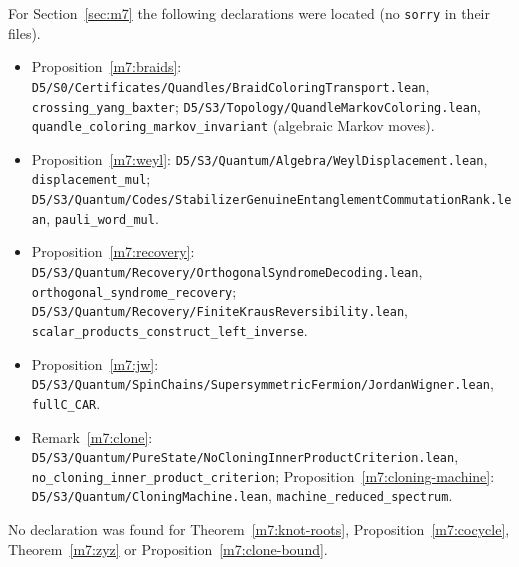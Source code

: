 \documentclass[11pt,reqno]{amsart}
\theoremstyle{definition}
\theoremstyle{remark}
\numberwithin{equation}{section}
\begin{document}
For Section~\ref{sec:m7} the following declarations were located (no \texttt{sorry} in their files).
{\small\raggedright
\begin{itemize}[leftmargin=1.5em]
\item Proposition~\ref{m7:braids}: \texttt{D5/S0/Certificates/Quandles/BraidColoringTransport.lean}, \texttt{crossing\_yang\_baxter};
\texttt{D5/S3/Topology/QuandleMarkovColoring.lean}, \texttt{quandle\_coloring\_markov\_invariant} (algebraic Markov moves).
\item Proposition~\ref{m7:weyl}: \texttt{D5/S3/Quantum/Algebra/WeylDisplacement.lean}, \texttt{displacement\_mul};
\texttt{D5/S3/Quantum/Codes/StabilizerGenuineEntanglementCommutationRank.lean}, \texttt{pauli\_word\_mul}.
\item Proposition~\ref{m7:recovery}: \texttt{D5/S3/Quantum/Recovery/OrthogonalSyndromeDecoding.lean}, \texttt{orthogonal\_syndrome\_recovery};
\texttt{D5/S3/Quantum/Recovery/FiniteKrausReversibility.lean}, \texttt{scalar\_products\_construct\_left\_inverse}.
\item Proposition~\ref{m7:jw}: \texttt{D5/S3/Quantum/SpinChains/SupersymmetricFermion/JordanWigner.lean}, \texttt{fullC\_CAR}.
\item Remark~\ref{m7:clone}: \texttt{D5/S3/Quantum/PureState/NoCloningInnerProductCriterion.lean}, \texttt{no\_cloning\_inner\_product\_criterion};
Proposition~\ref{m7:cloning-machine}: \texttt{D5/S3/Quantum/CloningMachine.lean}, \texttt{machine\_reduced\_spectrum}.
\end{itemize}}
No declaration was found for Theorem~\ref{m7:knot-roots}, Proposition~\ref{m7:cocycle}, Theorem~\ref{m7:zyz} or
Proposition~\ref{m7:clone-bound}.
\end{document}
